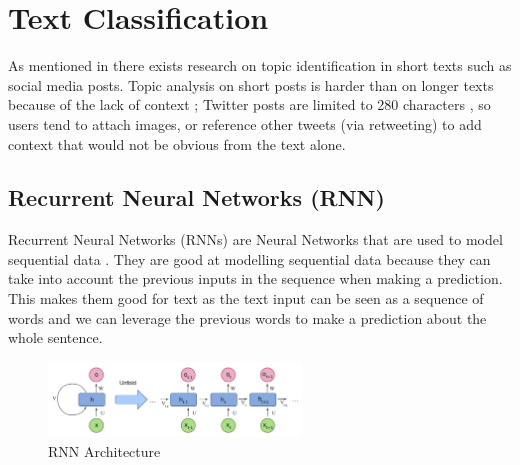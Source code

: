 \section{Text Classification}

As mentioned in  there exists research on topic identification in short texts such as social media posts.
Topic analysis on short posts is harder than on longer texts because of the lack of context \cite{DeepShortText}; Twitter posts are limited to 280
characters \cite{developers_counting_nodate}, so users tend to attach images, or reference other tweets (via retweeting) to add context that would not be obvious from
the text alone.



\subsection{Recurrent Neural Networks (RNN)}\label{sec:RNN}
Recurrent Neural Networks (RNNs) are Neural Networks that are used to model sequential data \cite{rnn-seq}. They are good at modelling sequential data
because they can take into account the previous inputs in the sequence when making a prediction. This makes them good for text
as the text input can be seen as a sequence of words and we can leverage the previous words to make a prediction about the whole sentence.\\
\begin{figure}[hbtp]
    \centering
    \includegraphics[width=0.6\textwidth]{../images/rnn.png}
    \caption{RNN Architecture}
    \label{fig:rnn}
\end{figure}

